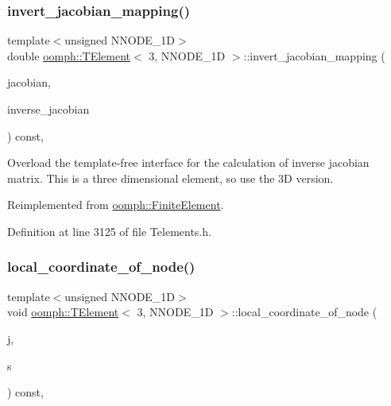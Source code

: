 \subsubsection{\texorpdfstring{invert\+\_\+jacobian\+\_\+mapping()}{invert\_jacobian\_mapping()}}
{\footnotesize\ttfamily template$<$unsigned N\+N\+O\+D\+E\+\_\+1D$>$ \\
double \hyperlink{classoomph_1_1TElement}{oomph\+::\+T\+Element}$<$ 3, N\+N\+O\+D\+E\+\_\+1D $>$\+::invert\+\_\+jacobian\+\_\+mapping (\begin{DoxyParamCaption}\item[{const \hyperlink{classoomph_1_1DenseMatrix}{Dense\+Matrix}$<$ double $>$ \&}]{jacobian,  }\item[{\hyperlink{classoomph_1_1DenseMatrix}{Dense\+Matrix}$<$ double $>$ \&}]{inverse\+\_\+jacobian }\end{DoxyParamCaption}) const\hspace{0.3cm}{\ttfamily [inline]}, {\ttfamily [virtual]}}



Overload the template-\/free interface for the calculation of inverse jacobian matrix. This is a three dimensional element, so use the 3D version. 



Reimplemented from \hyperlink{classoomph_1_1FiniteElement_a42c86a7628fee00d3a9d35b935b29e48}{oomph\+::\+Finite\+Element}.



Definition at line 3125 of file Telements.\+h.

\mbox{\label{classoomph_1_1TElement_3_013_00_01NNODE__1D_01_4_ab3aedab732464af390acf1c39eabb782}} 
\subsubsection{\texorpdfstring{local\+\_\+coordinate\+\_\+of\+\_\+node()}{local\_coordinate\_of\_node()}}
{\footnotesize\ttfamily template$<$unsigned N\+N\+O\+D\+E\+\_\+1D$>$ \\
void \hyperlink{classoomph_1_1TElement}{oomph\+::\+T\+Element}$<$ 3, N\+N\+O\+D\+E\+\_\+1D $>$\+::local\+\_\+coordinate\+\_\+of\+\_\+node (\begin{DoxyParamCaption}\item[{const unsigned \&}]{j,  }\item[{\hyperlink{classoomph_1_1Vector}{Vector}$<$ double $>$ \&}]{s }\end{DoxyParamCaption}) const\hspace{0.3cm}{\ttfamily [inline]}, {\ttfamily [virtual]}}



